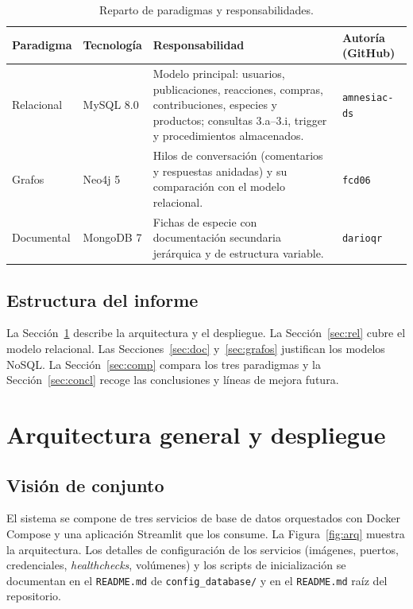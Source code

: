 \documentclass[11pt, a4paper]{article}
\begin{document}
\begin{table}[H]
\centering
\small
\begin{tabular}{
    >{\raggedright\arraybackslash}p{2.4cm}
    >{\raggedright\arraybackslash}p{2.8cm}
    >{\raggedright\arraybackslash}p{5.4cm}
    >{\raggedright\arraybackslash}p{2.4cm}}
\toprule
\textbf{Paradigma} & \textbf{Tecnología} & \textbf{Responsabilidad} & \textbf{Autoría (GitHub)} \\
\midrule
Relacional & MySQL 8.0 & Modelo principal: usuarios, publicaciones, reacciones, compras, contribuciones, especies y productos; consultas 3.a--3.i, trigger y procedimientos almacenados. & \texttt{amnesiac-ds} \\
Grafos & Neo4j 5 & Hilos de conversación (comentarios y respuestas anidadas) y su comparación con el modelo relacional. & \texttt{fcd06} \\
Documental & MongoDB 7 & Fichas de especie con documentación secundaria jerárquica y de estructura variable. & \texttt{darioqr} \\
\bottomrule
\end{tabular}
\caption{Reparto de paradigmas y responsabilidades.}
\label{tab:reparto}
\end{table}

\subsection{Estructura del informe}
La Sección~\ref{sec:arq} describe la arquitectura y el despliegue. La Sección~\ref{sec:rel} cubre el modelo relacional. Las Secciones~\ref{sec:doc} y~\ref{sec:grafos} justifican los modelos NoSQL. La Sección~\ref{sec:comp} compara los tres paradigmas y la Sección~\ref{sec:concl} recoge las conclusiones y líneas de mejora futura.

\section{Arquitectura general y despliegue}\label{sec:arq}

\subsection{Visión de conjunto}
El sistema se compone de tres servicios de base de datos orquestados con Docker Compose y una aplicación Streamlit que los consume. La Figura~\ref{fig:arq} muestra la arquitectura. Los detalles de configuración de los servicios (imágenes, puertos, credenciales, \textit{healthchecks}, volúmenes) y los scripts de inicialización se documentan en el \texttt{README.md} de \texttt{config\_database/} y en el \texttt{README.md} raíz del repositorio.
\end{document}
